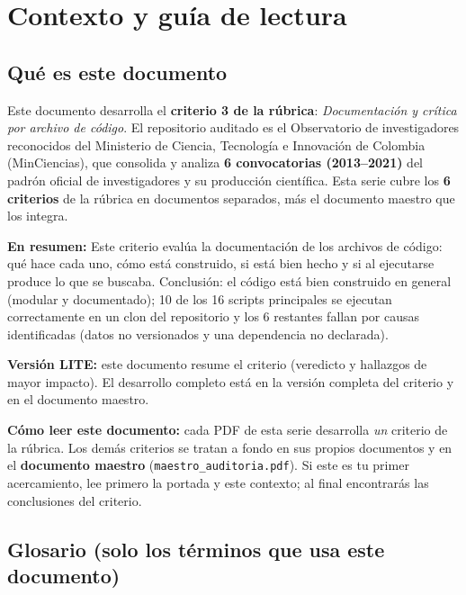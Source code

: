 \section{Contexto y guía de lectura}

\subsection{Qué es este documento}

Este documento desarrolla el \textbf{criterio 3 de la rúbrica}:
\emph{Documentación y crítica por archivo de código}. El repositorio auditado es el
Observatorio de investigadores reconocidos del Ministerio de Ciencia,
Tecnología e Innovación de Colombia (MinCiencias), que consolida y analiza
\textbf{6 convocatorias (2013--2021)} del padrón oficial de investigadores
y su producción científica. Esta serie cubre los \textbf{6 criterios} de la
rúbrica en documentos separados, más el documento maestro que los integra.

\textbf{En resumen:} Este criterio evalúa la documentación de los archivos de código: qué hace cada uno, cómo está construido, si está bien hecho y si al ejecutarse produce lo que se buscaba. Conclusión: el código está bien construido en general (modular y documentado); 10 de los 16 scripts principales se ejecutan correctamente en un clon del repositorio y los 6 restantes fallan por causas identificadas (datos no versionados y una dependencia no declarada).


\begin{tcolorbox}[nota]\textbf{Versión LITE:} este documento resume el criterio (veredicto y hallazgos de mayor impacto). El desarrollo completo está en la versión completa del criterio y en el documento maestro.\end{tcolorbox}

\begin{tcolorbox}[nota]
\textbf{Cómo leer este documento:} cada PDF de esta serie desarrolla \emph{un}
criterio de la rúbrica. Los demás criterios se tratan a fondo en sus propios
documentos y en el \textbf{documento maestro} (\texttt{maestro\_auditoria.pdf}).
Si este es tu primer acercamiento, lee primero la portada y este contexto; al
final encontrarás las conclusiones del criterio.
\end{tcolorbox}

\subsection{Glosario (solo los términos que usa este documento)}

